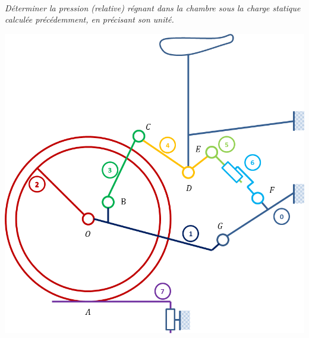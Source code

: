 \documentclass[11pt,oneside]{article}
\begin{document}
\paragraph{}
\textit{Déterminer la pression (relative) régnant dans la chambre sous la charge statique
calculée précédemment, en précisant son unité.}


\begin{center}
\includegraphics[width=.9\textwidth]{png/img3}
\end{center}
\end{document}
